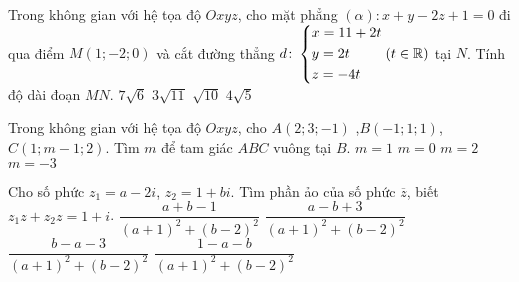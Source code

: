 \begin{ex}%
	Trong không gian với hệ tọa độ $Oxyz$, cho mặt phẳng $(\alpha)\colon x+y-2z+1=0$ đi qua điểm $M(1;-2;0)$ và cắt đường thẳng $d\colon \left\{\begin{aligned}&x=11+2t\\&y=2t\\&z=-4t\end{aligned}\right. (t\in \mathbb{R})$ tại $N$. Tính độ dài đoạn $MN$.
	\choice
	{$7\sqrt{6}$}
	{$3\sqrt{11}$}
	{$\sqrt{10}$}
	{\True $4\sqrt{5}$}
\end{ex}
\begin{ex}%
	Trong không gian với hệ tọa độ $Oxyz$, cho $A(2;3;-1)$ ,$B(-1;1;1)$, $C(1;m-1;2)$. Tìm $m$ để tam giác $ABC$ vuông tại $B$.
	\choice
	{$m=1$}
	{\True $m=0$}
	{$m=2$}
	{$m=-3$}
\end{ex}
\begin{ex}%
	Cho số phức $z_1=a-2i$, $z_2=1+bi$. Tìm phần ảo của số phức $\overline{z}$, biết $z_1z+z_2z=1+i$.
	\choice
	{$\dfrac{a+b-1}{\left(a+1\right)^2+\left(b-2\right)^2}$}
	{$\dfrac{a-b+3}{\left(a+1\right)^2+\left(b-2\right)^2}$}
	{\True $\dfrac{b-a-3}{\left(a+1\right)^2+\left(b-2\right)^2}$}
	{$\dfrac{1-a-b}{\left(a+1\right)^2+\left(b-2\right)^2}$}
\end{ex}
